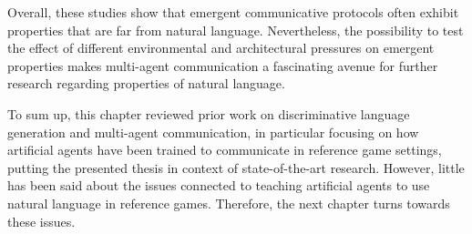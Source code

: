 Overall, these studies show that emergent communicative protocols often exhibit properties that are far from natural language. Nevertheless, the possibility to test the effect of different environmental and architectural pressures on emergent properties makes multi-agent communication a fascinating avenue for further research regarding properties of natural language. 



To sum up, this chapter reviewed prior work on discriminative language generation and multi-agent communication, in particular focusing on how artificial agents have been trained to communicate in reference game settings, putting the presented thesis in context of state-of-the-art research. However, little has been said about the issues connected to teaching artificial agents to use natural language in reference games. Therefore, the next chapter turns towards these issues.